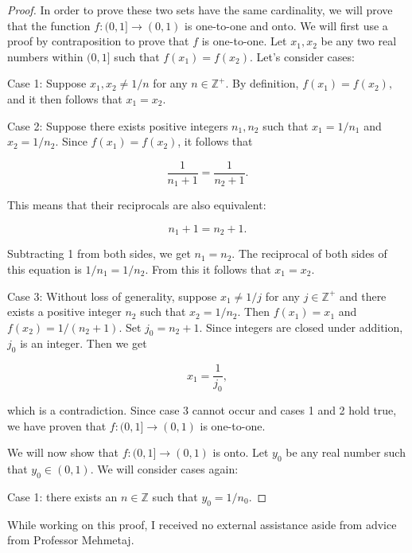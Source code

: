 \documentclass[12pt]{article}
\begin{document}
\begin{proof} In order to prove these two sets have the same cardinality, we will prove that the function $f : (0, 1] \to (0, 1) $ is one-to-one and onto. We will first use a proof by contraposition to prove that $f$ is one-to-one. Let $x_1, x_2$ be any two real numbers within $(0, 1]$ such that $f(x_1) = f(x_2)$. Let's consider cases:
    
    Case 1: Suppose $x_1, x_2 \neq 1/n$ for any $n \in \mathbb{Z}^+$. By definition, $f(x_1) = f(x_2),$ and it then follows that $x_1 = x_2$. 
    
    Case 2: Suppose there exists positive integers $n_1, n_2$ such that $x_1 = 1/n_1$ and $x_2 = 1/n_2$. Since $f(x_1) = f(x_2)$, it follows that

    $$\frac{1}{n_1 + 1} = \frac{1}{n_2 + 1}.$$

    This means that their reciprocals are also equivalent:

    $$n_1 + 1 = n_2 + 1.$$

    Subtracting 1 from both sides, we get $n_1 = n_2$. The reciprocal of both sides of this equation is $1/n_1 = 1/n_2$. From this it follows that $x_1 = x_2$.

    Case 3: Without loss of generality, suppose $x_1 \neq 1/j$ for any $j \in \mathbb{Z}^+$ and there exists a positive integer $n_2$ such that $x_2 = 1/n_2$. Then $f(x_1) = x_1$ and $f(x_2) = 1/(n_2 + 1)$. Set $j_0 = n_2 + 1$. Since integers are closed under addition, $j_0$ is an integer. Then we get

    $$x_1 = \frac{1}{j_0},$$

    which is a contradiction. Since case 3 cannot occur and cases 1 and 2 hold true, we have proven that $f: (0, 1] \to (0, 1)$ is one-to-one.

    \noindent
    We will now show that $f: (0, 1] \to (0, 1) $ is onto. Let $y_0$ be any real number such that $y_0 \in (0, 1)$. We will consider cases again:

    Case 1: there exists an $n \in \mathbb{Z}$ such that $y_0 = 1/n_0$.

\end{proof}


\noindent While working on this proof, I received no external assistance aside from advice from Professor Mehmetaj.
\end{document}
